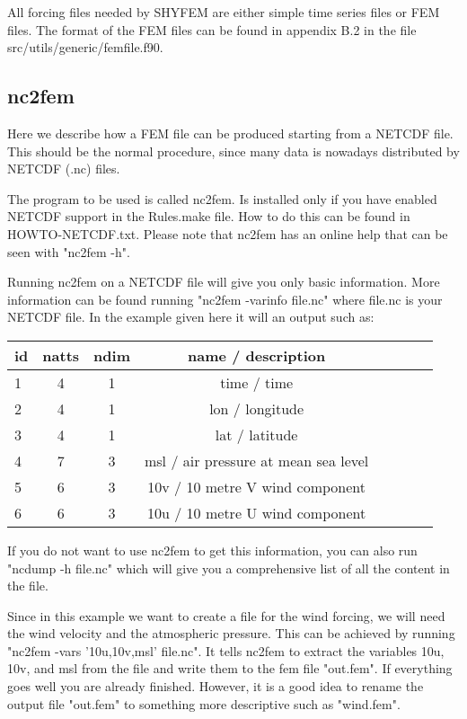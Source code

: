 All forcing files needed by SHYFEM are either simple time series files
or FEM files. The format of the FEM files can be found in appendix B.2 in the file src/utils/generic/femfile.f90.

\subsection{nc2fem}
Here we describe how a FEM file can be produced starting from a NETCDF
file. This should be the normal procedure, since many data is nowadays
distributed by NETCDF (.nc) files.

The program to be used is called nc2fem. Is installed only if you have
enabled NETCDF support in the Rules.make file. How to do this can be
found in HOWTO-NETCDF.txt.  Please note that nc2fem has an online help
that can be seen with "nc2fem -h".

Running nc2fem on a NETCDF file will give you only basic information.
More information can be found running "nc2fem -varinfo file.nc" where
file.nc is your NETCDF file. In the example given here it will an output
such as:\\

\begin{tabular}{lccccccl} \hline
  id & natts & ndim &  name / description \\
 \hline
  1   &  4   &  1      &  time  $/$ time \\
  2    & 4   &  1      & lon $/$ longitude \\
  3   &   4   &   1    & lat $/$ latitude \\
  4   &   7   &   3    & msl $/$ air pressure at mean sea level \\
  5   &   6   &   3   & 10v $/$ 10 metre V wind component \\
  6   &   6   &   3    &10u $/$ 10 metre U wind component \\
 \hline
\end{tabular}


If you do not want to use nc2fem to get this information, you can also
run "ncdump -h file.nc" which will give you a comprehensive list of all
the content in the file.

Since in this example we want to create a file for the wind forcing,
we will need the wind velocity and the atmospheric pressure. This can
be achieved by running "nc2fem -vars '10u,10v,msl' file.nc". It tells
nc2fem to extract the variables 10u, 10v, and msl from the file and
write them to the fem file "out.fem". If everything goes well you are
already finished. However, it is a good idea to rename the output file
"out.fem" to something more descriptive such as "wind.fem".

